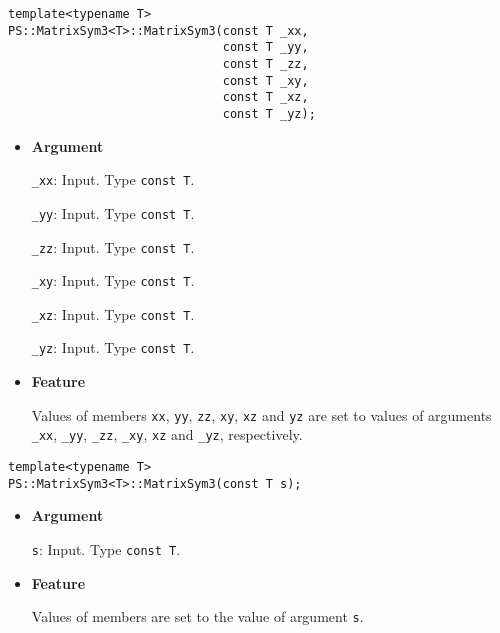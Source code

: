 \begin{screen}
\begin{verbatim}
template<typename T>
PS::MatrixSym3<T>::MatrixSym3(const T _xx,
                              const T _yy,
                              const T _zz,
                              const T _xy,
                              const T _xz,
                              const T _yz);
\end{verbatim}
\end{screen}

\begin{itemize}

\item{{\bf Argument}}

\texttt{\_xx}: Input. Type \texttt{const T}.

\texttt{\_yy}: Input. Type \texttt{const T}.

\texttt{\_zz}: Input. Type \texttt{const T}.

\texttt{\_xy}: Input. Type \texttt{const T}.

\texttt{\_xz}: Input. Type \texttt{const T}.

\texttt{\_yz}: Input. Type \texttt{const T}.

\item{{\bf Feature}}

Values of members \texttt{xx}, \texttt{yy}, \texttt{zz}, \texttt{xy},
\texttt{xz} and \texttt{yz} are set to values of arguments \texttt{\_xx},
\texttt{\_yy}, \texttt{\_zz}, \texttt{\_xy}, \texttt{xz} and \texttt{\_yz},
respectively.

\end{itemize}

\begin{screen}
\begin{verbatim}
template<typename T>
PS::MatrixSym3<T>::MatrixSym3(const T s);
\end{verbatim}
\end{screen}

\begin{itemize}

\item{{\bf Argument}}

\texttt{s}: Input. Type \texttt{const T}.

\item{{\bf Feature}}

Values of members are set to the value of argument \texttt{s}.

\end{itemize}

